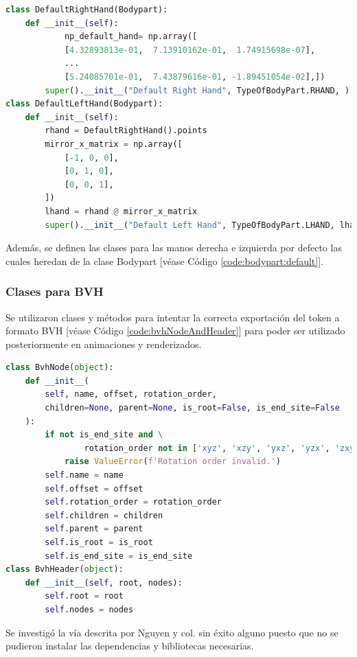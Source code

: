 \begin{lstlisting}[basicstyle=\tiny,language=Python, caption={Clase de las manos por defecto que heredan de la clase Bodypart}, label={code:bodypart:default}]
class DefaultRightHand(Bodypart):
    def __init__(self):
    		np_default_hand= np.array([
            [4.32893813e-01,  7.13910162e-01,  1.74915698e-07],
            ...
            [5.24085701e-01,  7.43879616e-01, -1.89451054e-02],])
        super().__init__("Default Right Hand", TypeOfBodyPart.RHAND, )
class DefaultLeftHand(Bodypart):
    def __init__(self):
        rhand = DefaultRightHand().points
        mirror_x_matrix = np.array([
            [-1, 0, 0],
            [0, 1, 0],
            [0, 0, 1],
        ])
        lhand = rhand @ mirror_x_matrix
        super().__init__("Default Left Hand", TypeOfBodyPart.LHAND, lhand)
\end{lstlisting}

Además, se definen las clases para las manos derecha e izquierda por defecto las cuales heredan de la clase Bodypart [véase Código \ref{code:bodypart:default}].

\subsubsection{Clases para BVH}
 Se utilizaron clases y métodos para intentar la correcta exportación del token a formato BVH [véase Código \ref{code:bvhNodeAndHeader}] para poder ser utilizado posteriormente en animaciones y renderizados. 
\begin{lstlisting}[basicstyle=\tiny,language=Python, caption={Clase referente a la jerarquía de BVH}, label={code:bvhNodeAndHeader}]
class BvhNode(object):
    def __init__(
        self, name, offset, rotation_order,
        children=None, parent=None, is_root=False, is_end_site=False
    ):
        if not is_end_site and \
                rotation_order not in ['xyz', 'xzy', 'yxz', 'yzx', 'zxy', 'zyx']:
            raise ValueError(f'Rotation order invalid.')
        self.name = name
        self.offset = offset
        self.rotation_order = rotation_order
        self.children = children
        self.parent = parent
        self.is_root = is_root
        self.is_end_site = is_end_site
class BvhHeader(object):
    def __init__(self, root, nodes):
        self.root = root
        self.nodes = nodes
\end{lstlisting}

Se investigó la vía descrita por Nguyen y col.  sin éxito alguno puesto que no se pudieron instalar las dependencias y bibliotecas necesarias.
 

